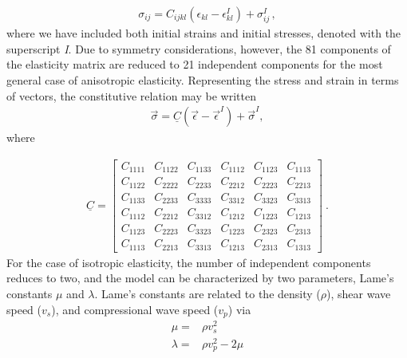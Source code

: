 \begin{gather}
\sigma_{ij}=C_{ijkl}\left(\epsilon_{kl}-\epsilon_{kl}^{I}\right)+\sigma_{ij}^{I}\,,\label{eq:1}
\end{gather}
where we have included both initial strains and initial stresses,
denoted with the superscript \textsl{I}. Due to symmetry considerations,
however, the 81 components of the elasticity matrix are reduced to
21 independent components for the most general case of anisotropic
elasticity. Representing the stress and strain in terms of vectors,
the constitutive relation may be written
\begin{gather}
\overrightarrow{\sigma}=\underline{C}\left(\vec{\epsilon}-\vec{\epsilon}^{I}\right)+\vec{\sigma}^{I},\label{eq:2}
\end{gather}
where

\begin{gather}
\underline{C}=\left[\begin{array}{cccccc}
C_{1111} & C_{1122} & C_{1133} & C_{1112} & C_{1123} & C_{1113}\\
C_{1122} & C_{2222} & C_{2233} & C_{2212} & C_{2223} & C_{2213}\\
C_{1133} & C_{2233} & C_{3333} & C_{3312} & C_{3323} & C_{3313}\\
C_{1112} & C_{2212} & C_{3312} & C_{1212} & C_{1223} & C_{1213}\\
C_{1123} & C_{2223} & C_{3323} & C_{1223} & C_{2323} & C_{2313}\\
C_{1113} & C_{2213} & C_{3313} & C_{1213} & C_{2313} & C_{1313}
\end{array}\right]\:.\label{eq:3}
\end{gather}
For the case of isotropic elasticity, the number of independent components
reduces to two, and the model can be characterized by two parameters,
Lame's constants $\mu$ and $\lambda$. Lame's constants are related
to the density ($\rho$), shear wave speed ($v_{s}$), and compressional
wave speed ($v_{p}$) via
\begin{equation}
\begin{aligned}\mu= & \rho v_{s}^{2}\\
\lambda= & \rho v_{p}^{2}-2\mu
\end{aligned}
\label{eq:4}
\end{equation}

